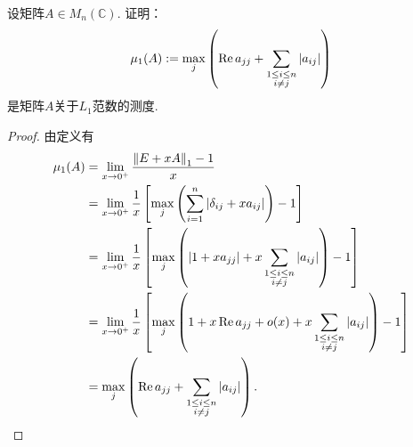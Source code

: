 \begin{example}
设矩阵\(A \in M_n(\mathbb{C})\).
证明：\begin{equation*}
	\mu_1(A)
	:=
	\max_j \left(
		\Re a_{jj}
		+ \sum_{\substack{1 \leq i \leq n \\ i \neq j}} \abs{a_{ij}}
	\right)
\end{equation*}
是矩阵\(A\)关于\(L_1\)范数的测度.
\begin{proof}
由定义有\begin{align*}
	\mu_1(A)
	&= \lim_{x \to 0^+} \frac{\norm{E + x A}_1 - 1}{x} \\
	&= \lim_{x \to 0^+} \frac{1}{x} \left[ \max_j \left( \sum_{i=1}^n \abs{ \delta_{ij} + x a_{ij} } \right) - 1 \right] \\
	&= \lim_{x \to 0^+} \frac{1}{x} \left[ \max_j \left( \abs{ 1 + x a_{jj} } + x \sum_{\substack{1 \leq i \leq n \\ i \neq j}} \abs{a_{ij}} \right) - 1 \right] \\
	&= \lim_{x \to 0^+} \frac{1}{x} \left[ \max_j \left( 1 + x \Re a_{jj} + o(x) + x \sum_{\substack{1 \leq i \leq n \\ i \neq j}} \abs{a_{ij}} \right) - 1 \right] \\
	&= \max_j \left( \Re a_{jj} + \sum_{\substack{1 \leq i \leq n \\ i \neq j}} \abs{a_{ij}} \right).
	\qedhere
\end{align*}
\end{proof}
\end{example}

